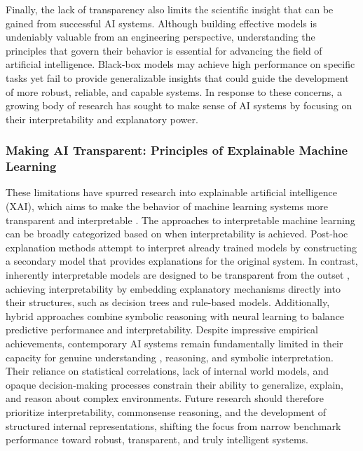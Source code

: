 \documentclass[12pt,a4paper]{report}
\begin{document}
Finally, the lack of transparency also limits the scientific insight that can be gained from successful AI systems. Although building effective models is undeniably valuable from an engineering perspective, understanding the principles that govern their behavior is essential for advancing the field of artificial intelligence. Black-box models may achieve high performance on specific tasks yet fail to provide generalizable insights that could guide the development of more robust, reliable, and capable systems.
In response to these concerns, a growing body of research has sought to make sense of AI systems by focusing on their interpretability and explanatory power.

\subsubsection{Making AI Transparent: Principles of Explainable Machine Learning}
These limitations have spurred research into explainable artificial intelligence (XAI), which aims to make the behavior of machine learning systems more transparent and interpretable \cite{chiave11,chiave12}. The approaches to interpretable machine learning can be broadly categorized based on when interpretability is achieved. Post-hoc explanation methods attempt to interpret already trained models by constructing a secondary model that provides explanations for the original system. In contrast, inherently interpretable models are designed to be transparent from the outset \cite{chiave13}, achieving interpretability by embedding explanatory mechanisms directly into their structures, such as decision trees and rule-based models. Additionally, hybrid approaches combine symbolic reasoning with neural learning to balance predictive performance and interpretability.
Despite impressive empirical achievements, contemporary AI systems remain fundamentally limited in their capacity for genuine understanding \cite{chiave8}, reasoning, and symbolic interpretation. Their reliance on statistical correlations, lack of internal world models, and opaque decision-making processes constrain their ability to generalize, explain, and reason about complex environments. Future research should therefore prioritize interpretability, commonsense reasoning, and the development of structured internal representations, shifting the focus from narrow benchmark performance toward robust, transparent, and truly intelligent systems.
\end{document}
